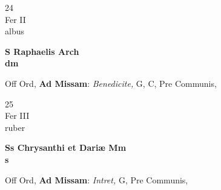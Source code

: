 \documentclass[10pt, openany]{book}
\begin{document}
        \begin{center}
            \begin{minipage}{3.5in}
                \vspace{2em}
                \begin{minipage}{0.5in}
                    {\Huge 24} \\
                    {\normalsize Fer II} \\
                    {\normalsize albus}
                \end{minipage}
                \begin{minipage}{3.0in}
                    \textbf{ \large S Raphaelis Arch \\
                    \textnormal{\normalsize dm}} \\ 
                \end{minipage}
                \begin{justify}Off Ord, \textbf{Ad Missam}: \textit{Benedicite,} G, C, Pre Communis,   
                \end{justify}
            \end{minipage}
        \end{center}
    
        \begin{center}
            \begin{minipage}{3.5in}
                \vspace{2em}
                \begin{minipage}{0.5in}
                    {\Huge 25} \\
                    {\normalsize Fer III} \\
                    {\normalsize ruber}
                \end{minipage}
                \begin{minipage}{3.0in}
                    \textbf{ \large Ss Chrysanthi et Dariæ Mm \\
                    \textnormal{\normalsize s}} \\ 
                \end{minipage}
                \begin{justify}Off Ord, \textbf{Ad Missam}: \textit{Intret,} G, Pre Communis,   
                \end{justify}
            \end{minipage}
        \end{center}
    
\end{document}
